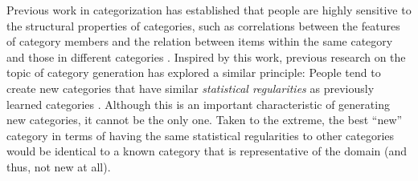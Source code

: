 \documentclass[12pt]{article}
\begin{document}
\begin{flushleft}


Previous work in categorization has established that people are highly sensitive to the structural properties of categories, such as correlations between the features of category members and the relation between items within the same category and those in different categories \citep{roschmervis1975,regier2007,shepard1961learning}. Inspired by this work, previous research on the topic of category generation has explored a similar principle: People tend to create new categories that have similar {\em statistical regularities} as previously learned categories \citep{jern2013probabilistic,ward1994structured}. Although this is an important characteristic of generating new categories, it cannot be the only one. Taken to the extreme, the best ``new'' category in terms of having the same statistical regularities to other categories would be identical to a known category that is representative of the domain (and thus, not new at all). 


\end{flushleft}
\end{document}

